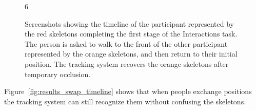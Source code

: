 \begin{figure}[!h]
{  }{6} \\

  \caption{Screenshots showing the timeline of the participant represented by the red skeletons completing the first stage of the Interactions task. The person is asked to walk to the front of the other participant represented by the orange skeletons, and then return to their initial position. The tracking system recovers the orange skeletons after temporary occlusion.}
  
  \label{fig:results_interaction_timeline}
\end{figure}

Figure~\ref{fig:results_swap_timeline} shows that when people exchange positions the tracking system can still recognize them without confusing the skeletons.

